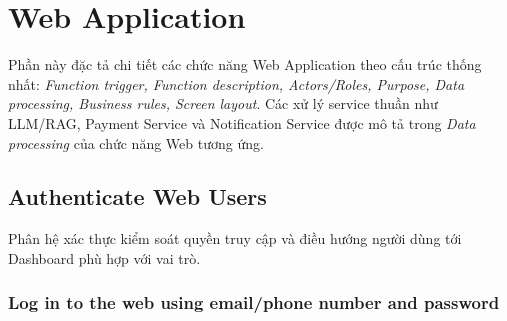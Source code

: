\documentclass[12pt,a4paper,oneside]{report}
\begin{document}
\section{Web Application}
\label{sec:web-application}

Phần này đặc tả chi tiết các chức năng Web Application theo cấu trúc thống nhất:
\textit{Function trigger, Function description, Actors/Roles, Purpose,
Data processing, Business rules, Screen layout}. Các xử lý service thuần
như LLM/RAG, Payment Service và Notification Service được mô tả trong
\textit{Data processing} của chức năng Web tương ứng.


\subsection{Authenticate Web Users}
\label{subsec:authenticate-web-users}

Phân hệ xác thực kiểm soát quyền truy cập và điều hướng người dùng tới Dashboard phù hợp với vai trò.

\subsubsection{Log in to the web using email/phone number and password}
\label{subsubsec:web-login}
\end{document}
